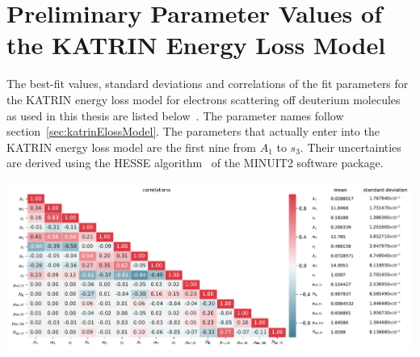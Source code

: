 \section{Preliminary Parameter Values of the KATRIN Energy Loss Model}
\label{sec:appendixKatrinElossElossModelParams}
The best-fit values, standard deviations and correlations of the fit parameters for the KATRIN energy loss model for electrons scattering off deuterium molecules as used in this thesis are listed below~\cite{Hannen2019_1}. The parameter names follow section~\ref{sec:katrinElossModel}. The parameters that actually enter into the KATRIN energy loss model are the first nine from $A_1$ to $s_3$. Their uncertainties are derived using the HESSE algorithm~\cite{James1998} of the MINUIT2 software package.

\includegraphics[width=\textwidth]{chapter/sensitivityStudyWithPreliminaryKatrinElossModel/appendix/fig/katrinElossParamValues.pdf}
\clearpage

